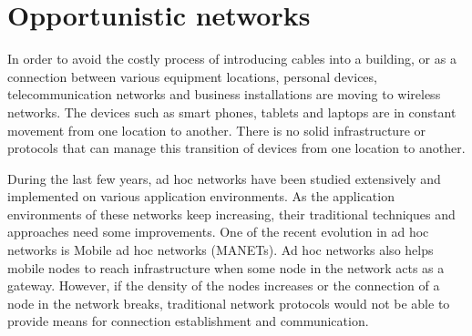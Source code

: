 \documentclass[conference]{IEEEtran}
\begin{document}
%
%

\section{Opportunistic networks}

In order to avoid the costly process of introducing cables into a building, or as a connection between various equipment locations, personal devices, telecommunication networks and business installations are moving to wireless networks. The devices such as smart phones, tablets and laptops are in constant movement from one location to another. There is no solid infrastructure or protocols that can manage this transition of devices from one location to another.

During the last few years, ad hoc networks have been studied extensively and implemented on various application environments. As the application environments of these networks keep increasing, their traditional techniques and approaches need some improvements. One of the recent evolution in ad hoc networks is Mobile ad hoc networks (MANETs). Ad hoc networks also helps mobile nodes to reach infrastructure when some node in the network acts as a gateway. However, if the density of the nodes increases or the connection of a node in the network breaks, traditional network protocols would not be able to provide means for connection establishment and communication.
\end{document}
